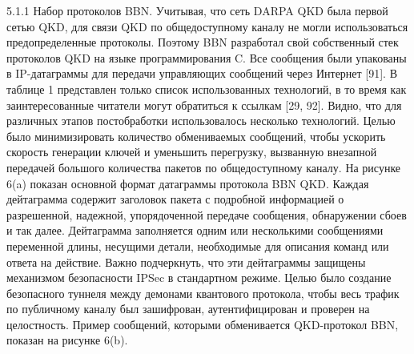 5.1.1 Набор протоколов BBN. Учитывая, что сеть DARPA QKD была первой сетью QKD, для связи QKD по общедоступному каналу не могли использоваться предопределенные протоколы.
Поэтому BBN разработал свой собственный стек протоколов QKD на языке программирования C. Все сообщения были упакованы в IP-датаграммы для передачи управляющих сообщений через Интернет [91].
В таблице 1 представлен только список использованных технологий, в то время как заинтересованные читатели могут обратиться к ссылкам [29, 92]. Видно, что для различных этапов постобработки использовалось несколько технологий. Целью было минимизировать количество обмениваемых сообщений, чтобы ускорить скорость генерации ключей и уменьшить перегрузку, вызванную внезапной передачей большого количества пакетов по общедоступному каналу. На рисунке 6(a) показан основной формат датаграммы протокола BBN QKD. Каждая дейтаграмма содержит заголовок пакета с подробной информацией о разрешенной, надежной, упорядоченной передаче сообщения, обнаружении сбоев и так далее.
Дейтаграмма заполняется одним или несколькими сообщениями переменной длины, несущими детали, необходимые для описания команд или ответа на действие. Важно подчеркнуть, что эти дейтаграммы защищены механизмом безопасности IPSec в стандартном режиме.
Целью было создание безопасного туннеля между демонами квантового протокола, чтобы весь трафик по публичному каналу был зашифрован, аутентифицирован и проверен на целостность. Пример сообщений, которыми обменивается QKD-протокол BBN, показан на рисунке 6(b).

